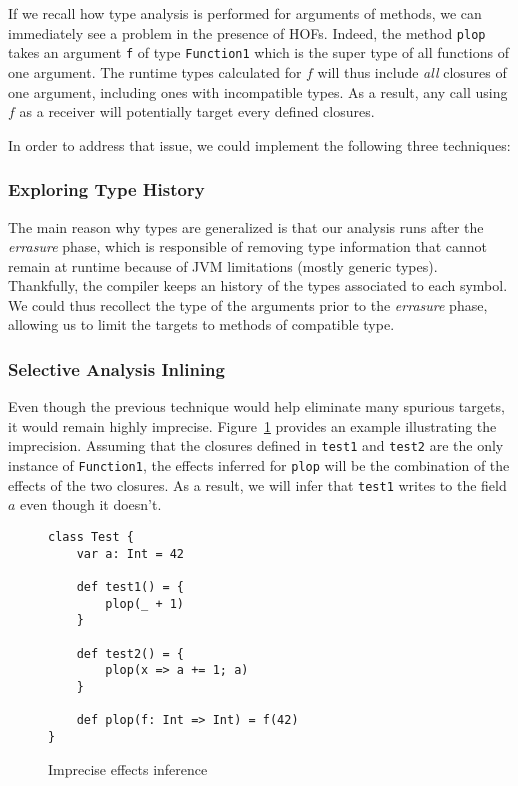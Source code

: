 If we recall how type analysis is performed for arguments of methods, we can
immediately see a problem in the presence of HOFs. Indeed, the method
\verb/plop/ takes an argument \verb/f/ of type \verb/Function1/ which is the
super type of all functions of one argument. The runtime types calculated for
$f$ will thus include \emph{all} closures of one argument, including ones with
incompatible types. As a result, any call using $f$ as a receiver will
potentially target every defined closures.

In order to address that issue, we could implement the following three
techniques:

\subsubsection{Exploring Type History}
The main reason why types are generalized is that our analysis runs
after the \emph{errasure} phase, which is responsible of removing type
information that cannot remain at runtime because of JVM limitations (mostly
generic types). Thankfully, the compiler keeps an history of the types
associated to each symbol. We could thus recollect the type of the arguments
prior to the \emph{errasure} phase, allowing us to limit the targets to methods
of compatible type.

\subsubsection{Selective Analysis Inlining}
Even though the previous technique would help eliminate many spurious targets,
it would remain highly imprecise. Figure~\ref{fig:con:inl} provides an example
illustrating the imprecision. Assuming that the closures defined in
\verb/test1/ and \verb/test2/ are the only instance of \verb/Function1/, the
effects inferred for \verb/plop/ will be the combination of the effects of the
two closures. As a result, we will infer that \verb/test1/ writes to the field
$a$ even though it doesn't.

\begin{figure}[h]
    \centering
\begin{lstlisting}
class Test {
    var a: Int = 42

    def test1() = {
        plop(_ + 1)
    }

    def test2() = {
        plop(x => a += 1; a)
    }

    def plop(f: Int => Int) = f(42)
}
\end{lstlisting}
    \caption{Imprecise effects inference}
    \label{fig:con:inl}
\end{figure}

